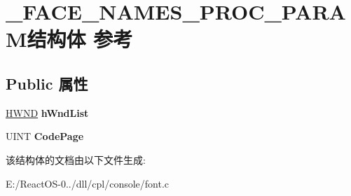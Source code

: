 \hypertarget{struct___f_a_c_e___n_a_m_e_s___p_r_o_c___p_a_r_a_m}{}\section{\+\_\+\+F\+A\+C\+E\+\_\+\+N\+A\+M\+E\+S\+\_\+\+P\+R\+O\+C\+\_\+\+P\+A\+R\+A\+M结构体 参考}
\label{struct___f_a_c_e___n_a_m_e_s___p_r_o_c___p_a_r_a_m}
\subsection*{Public 属性}
\begin{DoxyCompactItemize}
\item 
\mbox{\label{struct___f_a_c_e___n_a_m_e_s___p_r_o_c___p_a_r_a_m_a81401f052b4213926b290cc412eba0ab}} 
\hyperlink{interfacevoid}{H\+W\+ND} {\bfseries h\+Wnd\+List}
\item 
\mbox{\label{struct___f_a_c_e___n_a_m_e_s___p_r_o_c___p_a_r_a_m_a79a1ba67237faf5b2a31e9899bbbcf91}} 
U\+I\+NT {\bfseries Code\+Page}
\end{DoxyCompactItemize}


该结构体的文档由以下文件生成\+:\begin{DoxyCompactItemize}
\item 
E\+:/\+React\+O\+S-\/0../dll/cpl/console/font.\+c\end{DoxyCompactItemize}
